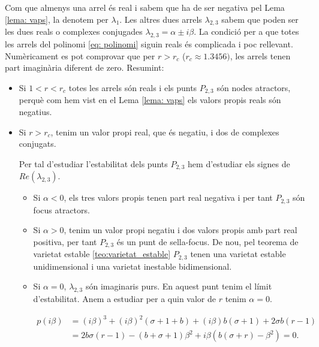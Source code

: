 \documentclass[11pt,a4paper,openright,oneside]{article}
\numberwithin{equation}{section}
\theoremstyle{definition}
\begin{document}
\begin{enumerate}
\begin{itemize}
        Com que almenys  una arrel és real i sabem que ha de ser negativa pel Lema \ref{lema: vaps}, la denotem per $\lambda_1$. Les altres dues arrels $\lambda_{2,3}$ sabem que poden ser les dues reals o complexes conjugades $\lambda_{2,3}=\alpha\pm i \beta$.  La condició per a que totes les arrels del polinomi \eqref{eq: polinomi} siguin reals és complicada i poc rellevant. Numèricament es pot comprovar que per $r>r_c$ ($r_c\approx1.3456)$, les arrels tenen part imaginària diferent de zero. Resumint: 
        
        \begin{itemize}
            \item Si $1<r<r_c$ totes les arrels són reals i els punts $P_{2,3}$ són nodes atractors, perquè com hem vist en el Lema \ref{lema: vaps} els valors propis reals són negatius.
        
            \item Si $r>r_c$, tenim un valor propi real, que és negatiu, i dos de complexes conjugats.
    
            Per tal d'estudiar l'estabilitat dels punts $P_{2,3}$ hem d'estudiar els signes de $Re(\lambda_{2,3})$.
    
            \begin{itemize}
                \item Si $\alpha<0$, els tres valors propis tenen part real negativa i per tant $P_{2,3}$ són focus atractors.
        
                \item Si $\alpha>0$, tenim un valor propi negatiu i dos valors propis amb part real positiva, per tant $P_{2,3}$ és un punt de sella-focus. De nou, pel teorema de varietat estable \ref{teo:varietat_estable} $P_{2,3}$ tenen una varietat estable unidimensional i una varietat inestable bidimensional.
        
                \item Si $\alpha=0$, $\lambda_{2,3}$ són imaginaris purs. En aquest punt tenim el límit d'estabilitat. Anem a estudiar per a quin valor de $r$ tenim $\alpha=0$.
        
                \begin{equation*} \begin{split}
                    p\left(i\beta\right)&=\left(i\beta\right)^{3}+\left(i\beta\right)^{2}\left(\sigma+1+b\right)+\left(i\beta\right)b\left(\sigma+1\right)+2\sigma b(r-1)\\&=2b\sigma(r-1)-(b + \sigma +1)\beta^{2}+i\beta\left(b(\sigma+r)-\beta^{2}\right)=0.
                \end{split}\end{equation*}
         

\end{itemize}
\end{itemize}
\end{itemize}
\end{enumerate}
\end{document}
